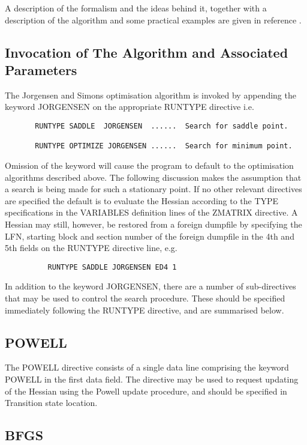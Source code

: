 \documentclass[11pt,fleqn]{article}
\begin{document}
A description of the formalism and the ideas behind it, together with a 
description of the algorithm and some practical examples are given in 
reference \cite{baker}.

\subsection{Invocation of The Algorithm and Associated Parameters}

The Jorgensen and Simons optimisation algorithm is invoked by 
appending the keyword JORGENSEN 
on the appropriate RUNTYPE directive i.e.

{
\footnotesize
\begin{verbatim}
       RUNTYPE SADDLE  JORGENSEN  ......  Search for saddle point.

       RUNTYPE OPTIMIZE JORGENSEN ......  Search for minimum point. 
\end{verbatim}
}
Omission of  the keyword will cause the program to default to 
the optimisation algorithms described above.
The following discussion makes 
the assumption that a search is being made for such a stationary point.
If no other relevant directives are specified the default is to 
evaluate the Hessian according to the TYPE specifications in the 
VARIABLES definition lines of the ZMATRIX directive.
A Hessian may still, however, be restored from a  foreign dumpfile 
by specifying the LFN, starting block and 
section number of the foreign dumpfile
in the 4th and 5th fields on the RUNTYPE directive line, e.g.

{
\footnotesize
\begin{verbatim}
          RUNTYPE SADDLE JORGENSEN ED4 1  
\end{verbatim}
}
In addition to the keyword JORGENSEN, there are a number
of sub-directives that may be used to control 
the search procedure. These should be specified immediately
following the RUNTYPE directive, and are summarised below.
 
\subsection{POWELL}

The POWELL directive consists of a single data line comprising
the keyword POWELL in the first data field. 
The directive may be used to request
updating of the  Hessian using the Powell update procedure,
and should be specified in Transition state location.

\subsection{BFGS}
\end{document}
